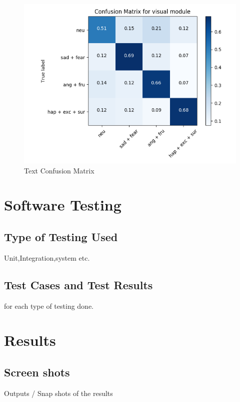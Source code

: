\documentclass[oneside,a4paper,12pt]{report}
\begin{document}
\begin{normalsize}
\begin{itemize}
\begin{itemize}
		\begin{center}
			\begin{figure}[!htbp]
				\centering
				\includegraphics[width=\textwidth]{text-confusion-matrix.png}
				\caption{Text Confusion Matrix}
				\label{fig:text-confusion-matrix}
			\end{figure}
		\end{center} 
		
		
	\end{itemize}
\end{itemize}


  
  
\chapter{Software Testing}
 \section{Type of Testing Used}
   Unit,Integration,system etc.
   \section{Test Cases and Test Results}
   for each type of testing done.    
   
\chapter{Results}
\section{Screen shots}
Outputs / Snap shots of the results

\end{normalsize}
\end{document}
